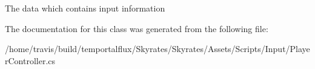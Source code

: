 The data which contains input information 



The documentation for this class was generated from the following file\-:\begin{DoxyCompactItemize}
\item 
/home/travis/build/temportalflux/\-Skyrates/\-Skyrates/\-Assets/\-Scripts/\-Input/Player\-Controller.\-cs\end{DoxyCompactItemize}
